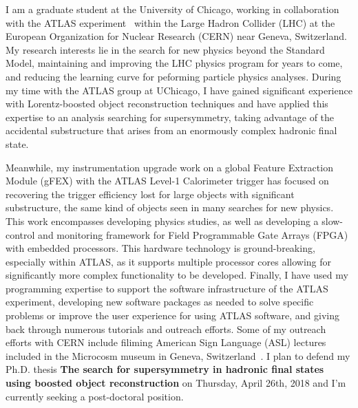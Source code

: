 \documentclass[letterpaper, 11pt]{article}
\begin{document}
\pagestyle{fancy}

I am a graduate student at the University of Chicago, working in collaboration with the ATLAS experiment~ within the Large Hadron Collider (LHC) at the European Organization for Nuclear Research (CERN) near Geneva, Switzerland. My research interests lie in the search for new physics beyond the Standard Model, maintaining and improving the LHC physics program for years to come, and reducing the learning curve for peforming particle physics analyses. During my time with the ATLAS group at UChicago, I have gained significant experience with Lorentz-boosted object reconstruction techniques and have applied this expertise to an analysis searching for supersymmetry, taking advantage of the accidental substructure that arises from an enormously complex hadronic final state.

Meanwhile, my instrumentation upgrade work on a global Feature Extraction Module (gFEX) with the ATLAS Level-1 Calorimeter trigger has focused on recovering the trigger efficiency lost for large objects with significant substructure, the same kind of objects seen in many searches for new physics. This work encompasses developing physics studies, as well as developing a slow-control and monitoring framework for Field Programmable Gate Arrays (FPGA) with embedded processors. This hardware technology is ground-breaking, especially within ATLAS, as it supports multiple processor cores allowing for significantly more complex functionality to be developed. Finally, I have used my programming expertise to support the software infrastructure of the ATLAS experiment, developing new software packages as needed to solve specific problems or improve the user experience for using ATLAS software, and giving back through numerous tutorials and outreach efforts. Some of my outreach efforts with CERN include filiming American Sign Language (ASL) lectures included in the Microcosm museum in Geneva, Switzerland~. I plan to defend my Ph.D. thesis \textbf{The search for supersymmetry in hadronic final states using boosted object reconstruction} on Thursday, April 26th, 2018 and I'm currently seeking a post-doctoral position.

\end{document}
